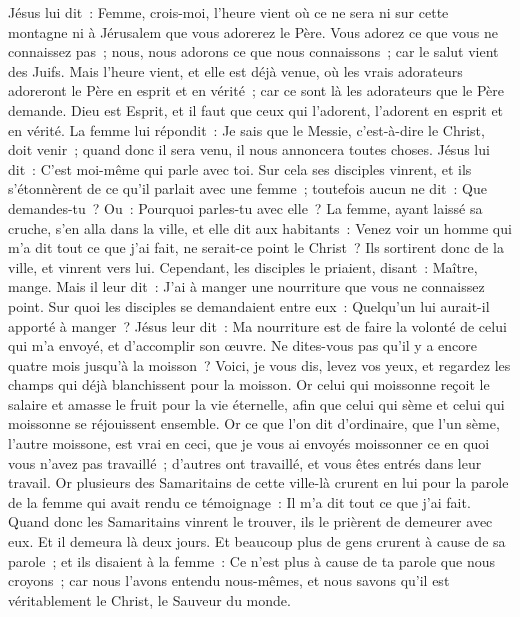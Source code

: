 \begin{multicols}{2}
Jésus lui dit~: Femme, crois-moi, l'heure vient où ce ne sera ni sur cette montagne ni à Jérusalem que vous adorerez le Père.
Vous adorez ce que vous ne connaissez pas~; nous, nous adorons ce que nous connaissons~; car le salut vient des Juifs.
Mais l'heure vient, et elle est déjà venue, où les vrais adorateurs adoreront le Père en esprit et en vérité~; car ce sont là les adorateurs que le Père demande.
Dieu est Esprit, et il faut que ceux qui l'adorent, l'adorent en esprit et en vérité.
La femme lui répondit~: Je sais que le Messie, c'est-à-dire le Christ, doit venir~; quand donc il sera venu, il nous annoncera toutes choses.
Jésus lui dit~: C'est moi-même qui parle avec toi.
Sur cela ses disciples vinrent, et ils s'étonnèrent de ce qu'il parlait avec une femme~; toutefois aucun ne dit~: Que demandes-tu~? Ou~: Pourquoi parles-tu avec elle~?
La femme, ayant laissé sa cruche, s'en alla dans la ville, et elle dit aux habitants~:
Venez voir un homme qui m'a dit tout ce que j'ai fait, ne serait-ce point le Christ~?
Ils sortirent donc de la ville, et vinrent vers lui.
Cependant, les disciples le priaient, disant~: Maître, mange.
Mais il leur dit~: J'ai à manger une nourriture que vous ne connaissez point.
Sur quoi les disciples se demandaient entre eux~: Quelqu'un lui aurait-il apporté à manger~?
Jésus leur dit~: Ma nourriture est de faire la volonté de celui qui m'a envoyé, et d'accomplir son œuvre.
Ne dites-vous pas qu'il y a encore quatre mois jusqu'à la moisson~? Voici, je vous dis, levez vos yeux, et regardez les champs qui déjà blanchissent pour la moisson.
Or celui qui moissonne reçoit le salaire et amasse le fruit pour la vie éternelle, afin que celui qui sème et celui qui moissonne se réjouissent ensemble.
Or ce que l'on dit d'ordinaire, que l'un sème, l'autre moissone, est vrai en ceci,
que je vous ai envoyés moissonner ce en quoi vous n'avez pas travaillé~; d'autres ont travaillé, et vous êtes entrés dans leur travail.
Or plusieurs des Samaritains de cette ville-là crurent en lui pour la parole de la femme qui avait rendu ce témoignage~: Il m'a dit tout ce que j'ai fait.
Quand donc les Samaritains vinrent le trouver, ils le prièrent de demeurer avec eux. Et il demeura là deux jours.
Et beaucoup plus de gens crurent à cause de sa parole~;
et ils disaient à la femme~: Ce n'est plus à cause de ta parole que nous croyons~; car nous l'avons entendu nous-mêmes, et nous savons qu'il est véritablement le Christ, le Sauveur du monde.

\end{multicols}
